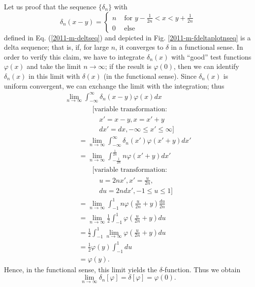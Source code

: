 {
\color{blue}
\bexample

Let us proof that the sequence $\{ \delta_n\}$ with
$$\delta_n(x-y) =
\left\{
\begin{array}{rl}
n & \textrm{ for } y - \frac{1}{2n}  < x < y+ \frac{1}{2n} \\
0& \textrm{ else }
\end{array}
\right.$$
defined in Eq. (\ref{2011-m-deltseq}) and depicted
in Fig.
\ref{2011-m-fdeltaplotnseq}
is a delta sequence;
that is, if, for large $n$, it converges to $\delta$ in a functional sense.
In order to verify this claim, we have to integrate $\delta_n(x)$
with ``good'' test functions $ \varphi (x)$ and take the limit $n\rightarrow \infty$;
if the result is $ \varphi (0)$, then we can identify $\delta_n(x)$ in this limit with $\delta (x)$
(in the functional sense).
Since $\delta_n(x)$ is uniform convergent, we can exchange the limit with the integration; thus
\begin{equation}
\begin{split}
\lim_{n\rightarrow \infty} \int_{-\infty}^\infty \delta_n(x-y) \varphi (x) dx \\
\qquad\qquad\textrm{[variable transformation:}  \\
\qquad\qquad\quad  x'=x-y, x= x'+y   \\
\qquad\qquad\quad  dx' =  dx, -\infty\le x' \le \infty \textrm{]} \\
\qquad =
\lim_{n\rightarrow \infty} \int_{-\infty}^\infty \delta_n(x') \varphi (x'+y) dx' \\
\qquad =
\lim_{n\rightarrow \infty} \int_{- \frac{1}{2n}}^\frac{1}{2n} n \varphi (x'+y) dx'    \\
\qquad\qquad\textrm{[variable transformation:}  \\
\qquad\qquad\quad  u=2nx', x'=\frac{u}{2n},    \\
\qquad\qquad\quad  du = 2n dx', -1\le u \le 1\textrm{]} \\
\qquad = \lim_{n\rightarrow \infty} \int_{- 1}^1 n \varphi (\frac{ u}{2n}+y) \frac{du}{2n}       \\
\qquad =
\lim_{n\rightarrow \infty} \frac{1}{2} \int_{- 1}^1 \varphi (\frac{ u}{2n}+y) du     \\
\qquad =
\frac{1}{2} \int_{- 1}^1 \lim_{n\rightarrow \infty} \varphi (\frac{ u}{2n}+y) du    \\
\qquad =
\frac{1}{2} \varphi (y) \int_{- 1}^1  du     \\
\qquad =
\varphi (y)
.
\end{split}
\end{equation}
Hence, in the functional sense,
this limit yields the $\delta$-function.
Thus we obtain
$$
\lim_{n\rightarrow \infty} \delta_n[\varphi] = \delta [\varphi] = \varphi (0).
$$
\eexample
}

